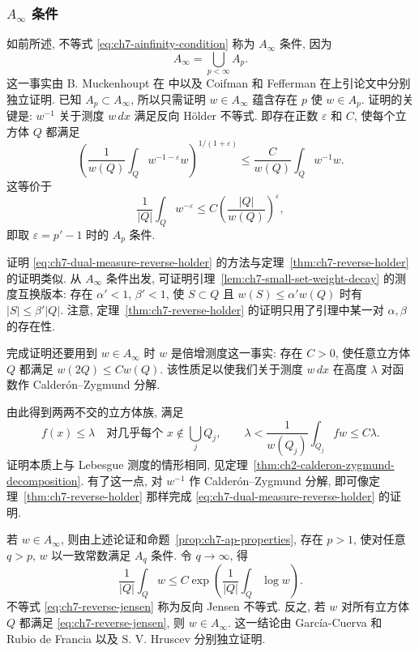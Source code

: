 \subsubsection{$A_\infty$ 条件}
\label{subsec:ch7-ainfinity-condition}

如前所述, 不等式 \eqref{eq:ch7-ainfinity-condition} 称为 $A_\infty$ 条件, 因为
\[
 A_\infty=\bigcup_{p<\infty}A_p.
\]
这一事实由 B. Muckenhoupt 在  中以及 Coifman 和 Fefferman 在上引论文中分别独立证明. 已知 $A_p\subset A_\infty$, 所以只需证明 $w\in A_\infty$ 蕴含存在 $p$ 使 $w\in A_p$. 证明的关键是: $w^{-1}$ 关于测度 $w\,dx$ 满足反向 Hölder 不等式. 即存在正数 $\varepsilon$ 和 $C$, 使每个立方体 $Q$ 都满足
\begin{equation}
\label{eq:ch7-dual-measure-reverse-holder}
 \left(\frac1{w(Q)}\int_Qw^{-1-\varepsilon}w\right)^{1/(1+\varepsilon)}
 \le\frac C{w(Q)}\int_Qw^{-1}w.
\end{equation}
这等价于
\[
 \frac1{|Q|}\int_Qw^{-\varepsilon}
 \le C\left(\frac{|Q|}{w(Q)}\right)^\varepsilon,
\]
即取 $\varepsilon=p'-1$ 时的 $A_p$ 条件.

证明 \eqref{eq:ch7-dual-measure-reverse-holder} 的方法与定理~\ref{thm:ch7-reverse-holder} 的证明类似. 从 $A_\infty$ 条件出发, 可证明引理~\ref{lem:ch7-small-set-weight-decay} 的测度互换版本: 存在 $\alpha'<1$, $\beta'<1$, 使 $S\subset Q$ 且 $w(S)\le\alpha'w(Q)$ 时有 $|S|\le\beta'|Q|$. 注意, 定理~\ref{thm:ch7-reverse-holder} 的证明只用了引理中某一对 $\alpha,\beta$ 的存在性.

完成证明还要用到 $w\in A_\infty$ 时 $w$ 是倍增测度这一事实: 存在 $C>0$, 使任意立方体 $Q$ 都满足 $w(2Q)\le Cw(Q)$. 该性质足以使我们关于测度 $w\,dx$ 在高度 $\lambda$ 对函数作 Calderón--Zygmund 分解.

\hypertarget{chapter-07-page-162}{}
由此得到两两不交的立方体族, 满足
\[
 f(x)\le\lambda\quad\text{对几乎每个 }x\notin\bigcup_jQ_j,
 \qquad
 \lambda<\frac1{w(Q_j)}\int_{Q_j}fw\le C\lambda.
\]
证明本质上与 Lebesgue 测度的情形相同, 见定理~\ref{thm:ch2-calderon-zygmund-decomposition}. 有了这一点, 对 $w^{-1}$ 作 Calderón--Zygmund 分解, 即可像定理~\ref{thm:ch7-reverse-holder} 那样完成 \eqref{eq:ch7-dual-measure-reverse-holder} 的证明.

若 $w\in A_\infty$, 则由上述论证和命题~\ref{prop:ch7-ap-properties}, 存在 $p>1$, 使对任意 $q>p$, $w$ 以一致常数满足 $A_q$ 条件. 令 $q\to\infty$, 得
\begin{equation}
\label{eq:ch7-reverse-jensen}
 \frac1{|Q|}\int_Qw
 \le C\exp\left(\frac1{|Q|}\int_Q\log w\right).
\end{equation}
不等式 \eqref{eq:ch7-reverse-jensen} 称为反向 Jensen 不等式. 反之, 若 $w$ 对所有立方体 $Q$ 都满足 \eqref{eq:ch7-reverse-jensen}, 则 $w\in A_\infty$. 这一结论由 García-Cuerva 和 Rubio de Francia  以及 S. V. Hruscev  分别独立证明.

